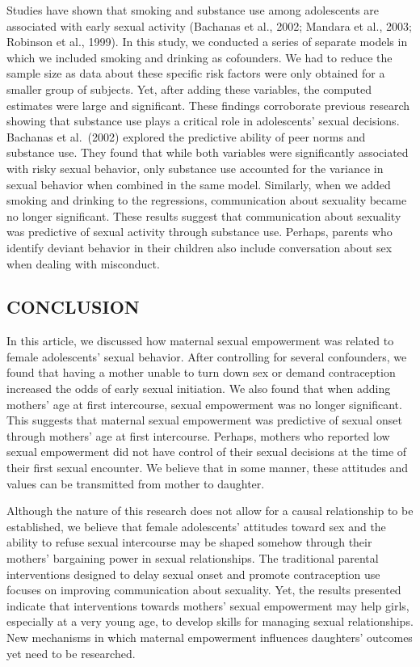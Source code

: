 \documentclass[
]{article}
\begin{document}
Studies have shown that smoking and substance use among adolescents are
associated with early sexual activity (Bachanas et al., 2002; Mandara et
al., 2003; Robinson et al., 1999). In this study, we conducted a series
of separate models in which we included smoking and drinking as
cofounders. We had to reduce the sample size as data about these
specific risk factors were only obtained for a smaller group of
subjects. Yet, after adding these variables, the computed estimates were
large and significant. These findings corroborate previous research
showing that substance use plays a critical role in adolescents' sexual
decisions. Bachanas et al.~(2002) explored the predictive ability of
peer norms and substance use. They found that while both variables were
significantly associated with risky sexual behavior, only substance use
accounted for the variance in sexual behavior when combined in the same
model. Similarly, when we added smoking and drinking to the regressions,
communication about sexuality became no longer significant. These
results suggest that communication about sexuality was predictive of
sexual activity through substance use. Perhaps, parents who identify
deviant behavior in their children also include conversation about sex
when dealing with misconduct.

\hypertarget{conclusion}{%
\subsection{CONCLUSION}\label{conclusion}}

In this article, we discussed how maternal sexual empowerment was
related to female adolescents' sexual behavior. After controlling for
several confounders, we found that having a mother unable to turn down
sex or demand contraception increased the odds of early sexual
initiation. We also found that when adding mothers' age at first
intercourse, sexual empowerment was no longer significant. This suggests
that maternal sexual empowerment was predictive of sexual onset through
mothers' age at first intercourse. Perhaps, mothers who reported low
sexual empowerment did not have control of their sexual decisions at the
time of their first sexual encounter. We believe that in some manner,
these attitudes and values can be transmitted from mother to daughter.

Although the nature of this research does not allow for a causal
relationship to be established, we believe that female adolescents'
attitudes toward sex and the ability to refuse sexual intercourse may be
shaped somehow through their mothers' bargaining power in sexual
relationships. The traditional parental interventions designed to delay
sexual onset and promote contraception use focuses on improving
communication about sexuality. Yet, the results presented indicate that
interventions towards mothers' sexual empowerment may help girls,
especially at a very young age, to develop skills for managing sexual
relationships. New mechanisms in which maternal empowerment influences
daughters' outcomes yet need to be researched.
\end{document}
